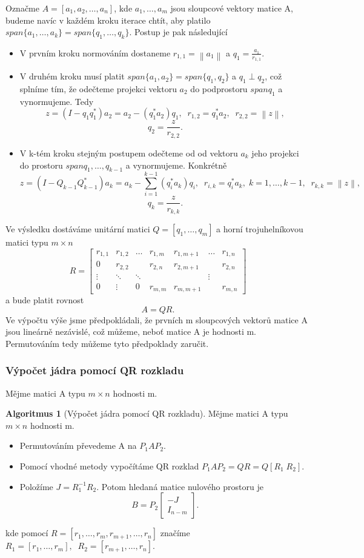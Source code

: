 \documentclass{article}
\theoremstyle{plain}
\theoremstyle{definition}
\newtheorem{algoritmus}{Algoritmus}
\begin{document}
Označme $A=[a_1,a_2,\hdots,a_n]$, kde $a_1,\hdots,a_m$ jsou sloupcové vektory matice A, budeme navíc v každém kroku iterace chtít, aby platilo $span\{a_1,\hdots,a_k\}=span\{q_1,\hdots,q_k\}.$ Postup je pak následující
\begin{itemize}
    \item V prvním kroku normováním dostaneme $r_{1,1}= \left \lVert a_1 \right \rVert$ a $q_1 = \frac{a_1}{r_{1,1}}$.
    \item V druhém kroku musí platit $span\{a_1,a_2\}=span\{q_1,q_2\}$ a $q_1 \perp q_2$, což splníme tím, že odečteme projekci vektoru $a_2$ do podprostoru $span{q_1}$ a vynormujeme. Tedy
    \[z=(I - q_1q_1^*)a_2=a_2-(q_1^*a_2)q_1, \;\; r_{1,2}= q_1^*a_2, \;\; r_{2,2}= \left \lVert z \right \rVert,\]
    \[q_2=\frac{z}{r_{2,2}}.\]
    \item V k-tém kroku stejným postupem odečteme od od vektoru $a_k$ jeho projekci do prostoru $span{q_1,\hdots,q_{k-1}}$ a vynormujeme. Konkrétně
    \[z=(I-Q_{k-1}Q_{k-1}^*)a_k=a_k - \sum_{i=1}^{k-1}(q_i^*a_k)q_i,\;\; r_{i,k}=q_i^*a_k,\; k=1,\hdots,k-1,\;\; r_{k,k}=\left \lVert z \right \rVert,\]
    \[q_k=\frac{z}{r_{k,k}}.\]
\end{itemize}
Ve výsledku dostáváme unitární matici $Q=[q_1,\hdots,q_m]$ a horní trojuhelníkovou matici typu $m \times n$
\[R=\begin{bmatrix}
    r_{1,1} & r_{1,2} & \hdots & r_{1,m} & r_{1,m+1} & \hdots & r_{1,n} \\
    0 & r_{2,2} & & r_{2,n} & r_{2,m+1} & & r_{2,n} \\
    \vdots & \ddots & \ddots & & &\vdots \\
    0 & \vdots & 0 & r_{m,m} & r_{m,m+1} & & r_{m,n}
\end{bmatrix}\]
a bude platit rovnost
\[A=QR.\]
Ve výpočtu výše jsme předpokládali, že prvních m sloupcových vektorů matice A jsou lineárně nezávislé, což můžeme, neboť matice A je hodnosti m. Permutováním tedy můžeme tyto předpoklady zaručit.

\subsubsection{Výpočet jádra pomocí QR rozkladu}
Mějme matici A typu $m \times n$ hodnosti m.
\begin{algoritmus}[Výpočet jádra pomocí QR rozkladu]
    Mějme matici A typu $m \times n$ hodnosti m.
    \begin{itemize}
        \item Permutováním převedeme A na $P_1AP_2.$
        \item Pomocí vhodné metody vypočítáme QR rozklad $P_1AP_2=QR=Q[R_1 \; R_2].$
        \item Položíme $J=R_1^{-1}R_2.$ Potom hledaná matice nulového prostoru je \[B=P_2 \begin{bmatrix}
            -J\\
            I_{n-m}
        \end{bmatrix}.\]
    \end{itemize}
    kde pomocí $R=[r_1,\hdots,r_m,r_{m+1},\hdots,r_n]$ značíme $R_1=[r_1,\hdots,r_m],\;\; R_2=[r_{m+1},\hdots,r_n].$
\end{algoritmus}
\end{document}
